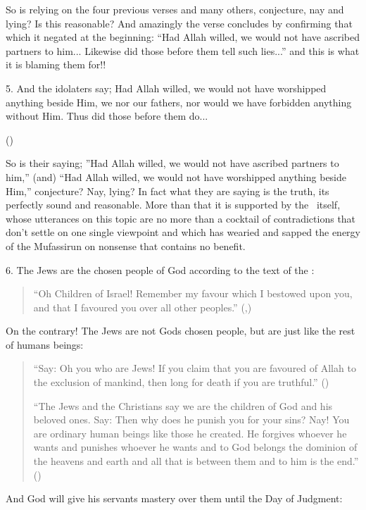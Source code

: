 \documentclass[12pt]{memoir}
\begin{document}
So is relying on the four previous verses and many others, conjecture,
nay and lying? Is this reasonable?
And amazingly the verse concludes by confirming
that which it negated at the beginning:
“Had Allah willed, we would not have ascribed partners to him...
Likewise did those before them tell such lies...”
and this is what it is blaming them for!!

5. And the idolaters say; Had Allah willed,
we would not have worshipped anything beside Him,
we nor our fathers, nor would we have forbidden anything without Him.
Thus did those before them do...

()

So is their saying;
”Had Allah willed, we would not have ascribed partners to him,” (and)
“Had Allah willed, we would not have worshipped anything beside Him,”
conjecture? Nay, lying?
In fact what they are saying is the truth, its perfectly sound and reasonable.
More than that it is supported by the \Quran\ itself,
whose utterances on this topic are no more than a cocktail of contradictions
that don’t settle on one single viewpoint and which has wearied
and sapped the energy of the Mufassirun on nonsense that contains no benefit.

6. The Jews are the chosen people of God according to the text of the \Quran:

\begin{quote}
“Oh Children of Israel! Remember my favour which I bestowed upon you,
and that I favoured you over all other peoples.”
(,)
\end{quote}

On the contrary! The Jews are not Gods chosen people,
but are just like the rest of humans beings:

\begin{quote}
“Say: Oh you who are Jews!
If you claim that you are favoured of Allah to the exclusion of mankind,
then long for death if you are truthful.” ()

“The Jews and the Christians say we are the children of God
and his beloved ones.
Say: Then why does he punish you for your sins? Nay!
You are ordinary human beings like those he created.
He forgives whoever he wants and punishes whoever he wants
and to God belongs the dominion of the heavens and earth
and all that is between them and to him is the end.” ()
\end{quote}

And God will give his servants mastery over them until the Day of Judgment:
\end{document}
